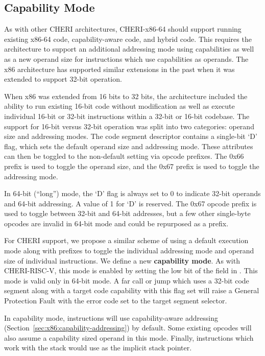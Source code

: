 \subsection{Capability Mode}

As with other CHERI architectures, CHERI-x86-64 should support running existing
x86-64 code, capability-aware code, and hybrid code.  This
requires the architecture to support an additional addressing mode
using capabilities as well as a new operand size for instructions
which use capabilities as operands.
The x86 architecture has supported similar extensions in the past when it was
extended to support 32-bit operation.

When x86 was extended from 16 bits to 32 bits, the architecture
included the ability to run existing 16-bit code without modification
as well as execute individual 16-bit or 32-bit instructions within a
32-bit or 16-bit codebase.  The support for 16-bit versus 32-bit
operation was
split into two categories: operand size and addressing modes.  The
code segment descriptor contains a single-bit `D' flag, which sets the
default operand size and addressing mode.  These attributes can then
be toggled to the non-default setting via opcode prefixes.  The 0x66
prefix is used to toggle the operand size, and the 0x67 prefix is used
to toggle the addressing mode.

In 64-bit (``long'') mode, the `D' flag is always set to
0 to indicate 32-bit operands and 64-bit addressing.  A value of
1 for `D' is reserved.  The 0x67 opcode prefix is used to toggle
between 32-bit and 64-bit addresses, but a few other single-byte opcodes
are invalid in 64-bit mode and could be repurposed as a prefix.

For CHERI support, we propose a similar scheme of using a default
execution mode along with prefixes to toggle the individual addressing
mode and operand size of individual instructions.  We define a new
\textbf{capability mode}.  As with CHERI-RISC-V, this mode is enabled
by setting the low bit of the \cflags{} field in \CIP{}.  This mode is
valid only in 64-bit mode.  A far call or jump which uses a 32-bit
code segment along with a target code capability with this flag set
will raise a General Protection Fault with the error code set to the
target segment selector.

In capability mode, instructions will use capability-aware addressing
(Section~\ref{sec:x86:capability-addressing}) by default.  Some existing
opcodes will also assume a capability sized operand in this mode.
Finally, instructions which work with the stack would use \CSP{} as
the implicit stack pointer.

